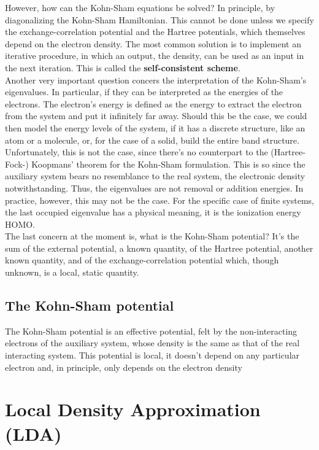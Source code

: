 \documentclass{homework}
\begin{document}
However, how can the Kohn-Sham equations be solved? In principle, by diagonalizing the Kohn-Sham Hamiltonian. This cannot be done unless we specify the exchange-correlation potential and the Hartree potentials, which themselves depend on the electron density. The most common solution is to implement an iterative procedure, in which an output, the density, can be used as an input in the next iteration. This is called the \textbf{self-consistent scheme}. \\

Another very important question concers the interpretation of the Kohn-Sham's eigenvalues. In particular, if they can be interpreted as the energies of the electrons. The electron's energy is defined as the energy to extract the electron from the system and put it infinitely far away. Should this be the case, we could then model the energy levels of the system, if it has a discrete structure, like an atom or a molecule, or, for the case of a solid, build the entire band structure. Unfortunately, this is not the case, since there's no counterpart to the (Hartree-Fock-) Koopmans' theorem for the Kohn-Sham formulation. This is so since the auxiliary system bears no resemblance to the real system, the electronic density notwithstanding. Thus, the eigenvalues are not removal or addition energies. In practice, however, this may not be the case. For the specific case of finite systems, the last occupied eigenvalue has a physical meaning, it is the ionization energy HOMO. \\

The last concern at the moment is, what is the Kohn-Sham potential? It's the sum of the external potential, a known quantity, of the Hartree potential, another known quantity, and of the exchange-correlation potential which, though unknown, is a local, static quantity. 

\subsection{The Kohn-Sham potential}

The Kohn-Sham potential is an effective potential, felt by the non-interacting electrons of the auxiliary system, whose density is the same as that of the real interacting system. This potential is local, it doesn't depend on any particular electron and, in principle, only depends on the electron density 

\section{Local Density Approximation (LDA)}
\end{document}
